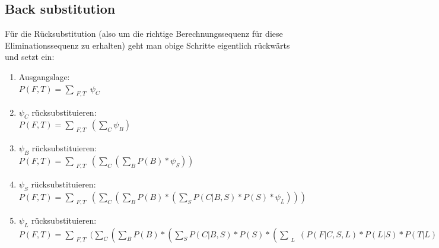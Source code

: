 \subsection{Back substitution}
Für die Rücksubstitution (also um die richtige Berechnungssequenz für diese Eliminationssequenz zu erhalten) geht man obige Schritte eigentlich rückwärts und setzt ein:

\begin{enumerate}
\item Ausgangslage: \\
$P(F,T) = \sum_{\substack{F, T}} \psi_C$
\item $\psi_C$ rücksubstituieren:\\
$P(F,T) = \sum_{\substack{F, T}} (\sum_C \psi_B)$
\item $\psi_B$ rücksubstituieren:\\
$P(F,T) = \sum_{\substack{F, T}} (\sum_C (\sum_B P(B) * \psi_S))$
\item $\psi_S$ rücksubstituieren:\\
$P(F,T) = \sum_{\substack{F, T}} (\sum_C (\sum_B P(B) * (\sum_{S} P(C | B, S) * P(S) * \psi_L)))$
\item $\psi_L$ rücksubstituieren:\\
$P(F,T) = \sum_{\substack{F, T}} (\sum_C (\sum_B P(B) * (\sum_{S} P(C | B, S) * P(S) * (\sum_{\substack{L}}(P(F|C,S,L) * P(L|S)*P(T|L)))))$
\end{enumerate}